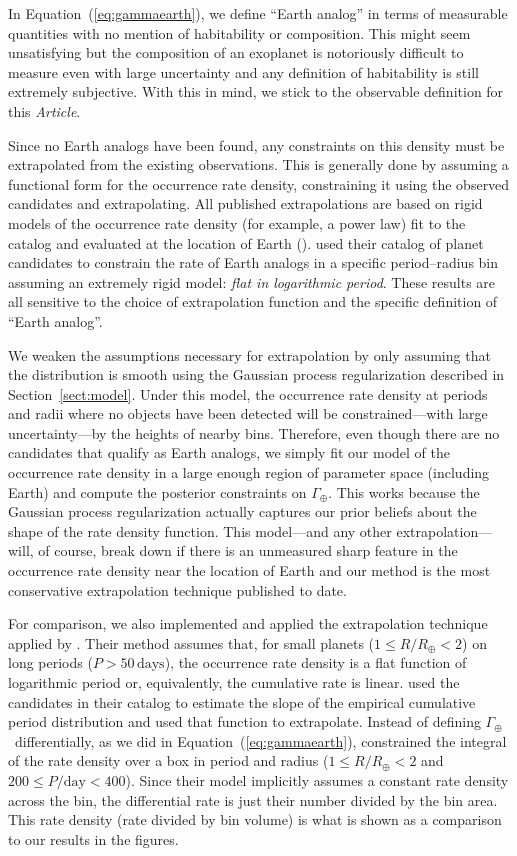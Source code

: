 \documentclass[12pt,preprint]{aastex}
\newcommand{\paper}{\textsl{Article}}
\newcommand{\Eq}[1]{Equation~(\ref{eq:#1})}
\newcommand{\eq}[1]{\Eq{#1}}
\newcommand{\Sect}[1]{Section~\ref{sect:#1}}
\newcommand{\sect}[1]{\Sect{#1}}
\newcommand{\rate}{\ensuremath{\Gamma}}
\newcommand{\radius}{\ensuremath{R}}
\newcommand{\period}{\ensuremath{P}}
\newcommand{\gammaearth}{{\ensuremath{\rate_\oplus}}}
\begin{document}
In \eq{gammaearth}, we define ``Earth analog'' in terms of measurable
quantities with no mention of habitability or composition.
This might seem unsatisfying but the composition of an exoplanet is
notoriously difficult to measure even with large uncertainty and any
definition of habitability is still extremely subjective.
With this in mind, we stick to the observable definition for this \paper.

Since no Earth analogs have been found, any constraints on this density must
be extrapolated from the existing observations.
This is generally done by assuming a functional form for the occurrence rate
density, constraining it using the observed candidates and extrapolating.
All published extrapolations are based on rigid models of the occurrence rate
density (for example, a power law) fit to the catalog and evaluated at the
location of Earth (\citealt{catanzarite, traub}).
\citet{petigura} used their catalog of planet candidates to constrain the rate
of Earth analogs in a specific period--radius bin assuming an extremely rigid
model: \emph{flat in logarithmic period}.
These results are all sensitive to the choice of extrapolation function and
the specific definition of ``Earth analog''.

We weaken the assumptions necessary for extrapolation by only assuming that
the distribution is smooth using the Gaussian process regularization described
in \sect{model}.
Under this model, the occurrence rate density at periods and radii where no
objects have been detected will be constrained---with large uncertainty---by
the heights of nearby bins.
Therefore, even though there are no candidates that qualify as Earth analogs,
we simply fit our model of the occurrence rate density in a large enough
region of parameter space (including Earth) and compute the posterior
constraints on \gammaearth.
This works because the Gaussian process regularization actually captures our
prior beliefs about the shape of the rate density function.
This model---and any other extrapolation---will, of course, break down if
there is an unmeasured sharp feature in the occurrence rate density near the
location of Earth and our method is the most conservative extrapolation
technique published to date.

For comparison, we also implemented and applied the extrapolation technique
applied by \citet{petigura}.
Their method assumes that, for small planets ($1 \le \radius/\radius_\oplus <
2$) on long periods ($\period > 50\,\mathrm{days}$), the occurrence rate
density is a flat function of logarithmic period or, equivalently, the
cumulative rate is linear.
\citet{petigura} used the candidates in their catalog to estimate the slope of
the empirical cumulative period distribution and used that function to
extrapolate.
Instead of defining \gammaearth\ differentially, as we did in \eq{gammaearth},
\citet{petigura} constrained the integral of the rate density over a box in
period and radius ($1 \le \radius/\radius_\oplus < 2$ and $200 \le
\period/\mathrm{day} < 400$).
Since their model implicitly assumes a constant rate density across the bin,
the differential rate is just their number divided by the bin area.
This rate density (rate divided by bin volume) is what is shown as a
comparison to our results in the figures.
\end{document}

